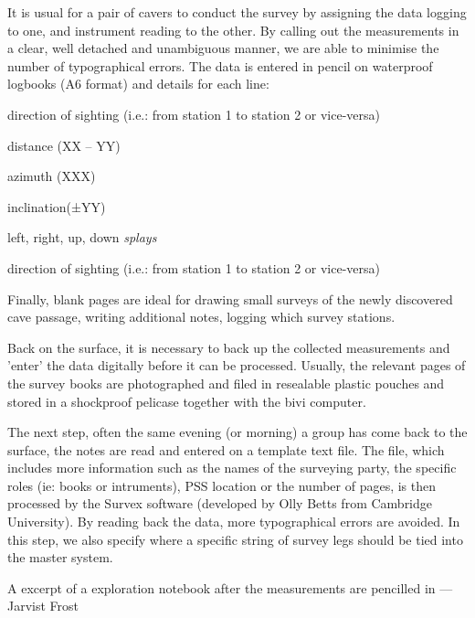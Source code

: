 It is usual for a pair of cavers to conduct the survey by assigning the data logging to one, and instrument reading to the other. By calling out the measurements in a clear, well detached and unambiguous manner, we are able to minimise the number of typographical errors. The data is entered in pencil on waterproof logbooks (A6 format) and details for each line:

\begin{citemize}
\item direction of sighting (i.e.: from station 1 to station 2 or vice-versa)
\item distance (XX – YY)
\item azimuth (XXX)
\item inclination(±YY)
\item left, right, up, down \emph{splays}
\item direction of sighting (i.e.: from station 1 to station 2 or vice-versa)
\end{citemize}

Finally, blank pages are ideal for drawing small surveys of the newly discovered cave passage, writing additional notes, logging which survey stations.

Back on the surface, it is necessary to back up the collected measurements and 'enter' the data digitally before it can be processed. Usually, the relevant pages of the survey books are photographed and filed in resealable plastic pouches and stored in a shockproof pelicase together with the bivi computer. 

The next step, often the same evening (or morning) a group has come back to the surface, the notes are read and entered on a template text file. The file, which includes more information such as the names of the surveying party, the specific roles (ie: books or intruments), PSS location or the number of pages, is then processed by the Survex software (developed by Olly Betts from Cambridge University). By reading back the data, more typographical errors are avoided. In this step, we also specify where a specific string of survey legs should be tied into the master system. 

\begin{marginfigure}
\checkoddpage \ifoddpage \forcerectofloat \else \forceversofloat \fi
\centering
 \caption{A excerpt of a exploration notebook after the measurements are pencilled in ---Jarvist Frost}
 \label{notebook}
\end{marginfigure}

